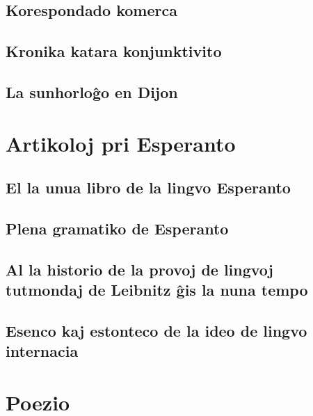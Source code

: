 \documentclass[a5paper,11pt,openany,twoside]{book}
\begin{document}
\section{Korespondado komerca}
\label{komerca}


\section{Kronika katara konjunktivito}
\label{kronika}


\section{La sunhorlo\^go en Dijon}
\label{dijon}


%
%
\chapter{Artikoloj pri Esperanto}
\section{El la unua libro de la lingvo Esperanto}
\label{unualibro}


\section{Plena gramatiko de Esperanto}
\label{plena}


\section[Al la historio de la provoj de lingvoj]{Al la historio de la provoj
de lingvoj tutmondaj de Leibnitz \^gis la  nuna tempo}
\label{leibnitz}


\section[Esenco kaj estonteco de la ideo de lingvo]{Esenco kaj estonteco de
la ideo de lingvo internacia}
\label{esenco}


%
%
\chapter{Poezio}
\end{document}
